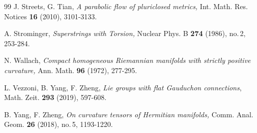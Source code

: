 \documentclass{amsart}
\numberwithin{equation}{section}
\theoremstyle{definition}
\renewcommand{\1}{\mathds{1}}
\renewcommand{\>}{\rightarrow}
\begin{document}
\begin{thebibliography}{99}
 J. Streets, G. Tian,\emph{ A parabolic flow of pluriclosed metrics,} Int. Math. Res. Notices {\bf 16} (2010), 3101-3133.



 A. Strominger,
\newblock \emph{Superstrings with Torsion,}
\newblock Nuclear Phys. B {\bf 274} (1986), no.\,2, 253-284.





 N. Wallach,
\newblock \textit{Compact homogeneous Riemannian manifolds with strictly positive curvature,}
\newblock Ann. Math. {\bf 96} (1972), 277-295.



 L. Vezzoni, B. Yang, F. Zheng,
\newblock \textit{Lie groups with flat Gauduchon connections},
\newblock Math. Zeit. \textbf{293} (2019), 597-608.

 B. Yang, F. Zheng,
\newblock \textit{On curvature tensors of Hermitian manifolds,}
\newblock Comm. Anal. Geom. {\bf 26} (2018), no.\,5, 1193-1220.



\end{thebibliography}
\end{document}
